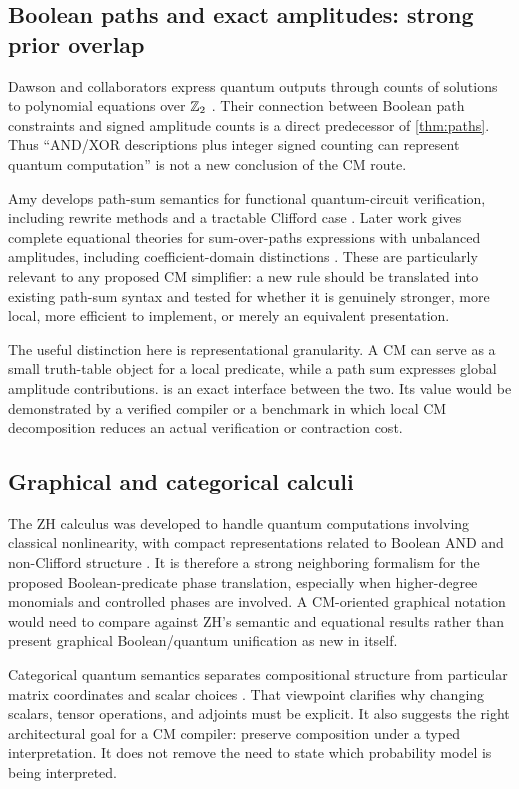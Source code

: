 \subsection{Boolean paths and exact amplitudes: strong prior overlap}
Dawson and collaborators express quantum outputs through counts of solutions to polynomial equations over $\mathbb Z_2$ \cite{dawson}. Their connection between Boolean path constraints and signed amplitude counts is a direct predecessor of \cref{thm:paths}. Thus ``AND/XOR descriptions plus integer signed counting can represent quantum computation'' is not a new conclusion of the CM route.

Amy develops path-sum semantics for functional quantum-circuit verification, including rewrite methods and a tractable Clifford case \cite{amy2019}. Later work gives complete equational theories for sum-over-paths expressions with unbalanced amplitudes, including coefficient-domain distinctions \cite{amy2023}. These are particularly relevant to any proposed CM simplifier: a new rule should be translated into existing path-sum syntax and tested for whether it is genuinely stronger, more local, more efficient to implement, or merely an equivalent presentation.

The useful distinction here is representational granularity. A CM can serve as a small truth-table object for a local predicate, while a path sum expresses global amplitude contributions.  is an exact interface between the two. Its value would be demonstrated by a verified compiler or a benchmark in which local CM decomposition reduces an actual verification or contraction cost.

\subsection{Graphical and categorical calculi}
The ZH calculus was developed to handle quantum computations involving classical nonlinearity, with compact representations related to Boolean AND and non-Clifford structure \cite{zh}. It is therefore a strong neighboring formalism for the proposed Boolean-predicate phase translation, especially when higher-degree monomials and controlled phases are involved. A CM-oriented graphical notation would need to compare against ZH's semantic and equational results rather than present graphical Boolean/quantum unification as new in itself.

Categorical quantum semantics separates compositional structure from particular matrix coordinates and scalar choices \cite{abramsky}. That viewpoint clarifies why changing scalars, tensor operations, and adjoints must be explicit. It also suggests the right architectural goal for a CM compiler: preserve composition under a typed interpretation. It does not remove the need to state which probability model is being interpreted.

